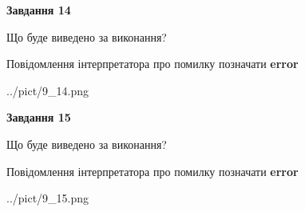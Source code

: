 \documentclass[11pt, ukrainian]{article}
\begin{document}
{\begin {large}
{\begin {center}\textbf{Завдання 14}\end {center}}\par
Що буде виведено за виконання? \par
Повідомлення інтерпретатора про помилку позначати \textbf{error}

\begin{center}
	{../pict/9_14.png}
\end{center}
\newpage

{\begin {center}\textbf{Завдання 15}\end {center}}\par
Що буде виведено за виконання? \par
Повідомлення інтерпретатора про помилку позначати \textbf{error}

\begin{center}
	{../pict/9_15.png}
\end{center}
\newpage

\end {large}}
\end{document}
